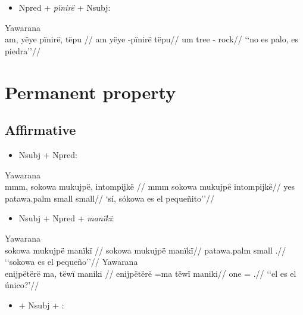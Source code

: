 \documentclass{memoir}
\begin{document}
\begin{itemize}
\tightlist
\item
  Npred + \emph{pïnirë} + Nsubj:
\end{itemize}

\ex Yawarana \\
\label{histyarirdi-623}    \begingl
    \glpreamble am, yëye pïnirë, tëpu //
    \gla am yëye -pïnirë tëpu//
    \glb um tree - rock//
        \glft ‘‘no es palo, es piedra’’//  
    \endgl 
\xe

\section{Permanent property}

\subsection{Affirmative}

\begin{itemize}
\tightlist
\item
  Nsubj + Npred:
\end{itemize}

\ex Yawarana \\
\label{convinsectmaj-118}    \begingl
    \glpreamble mmm, sokowa mukujpë, intompijkë //
    \gla mmm sokowa mukujpë intompijkë//
    \glb yes patawa.palm small small//
        \glft ‘sí, sókowa es el pequeñito’’//  
    \endgl 
\xe

\begin{itemize}
\tightlist
\item
  Nsubj + Npred + \emph{manïkï}:
\end{itemize}

\pex\label{}    \a Yawarana\\
    \label{convinsectmaj-108}        \begingl
        \glpreamble sokowa mukujpë manïkï //
        \gla sokowa mukujpë manïkï//
        \glb patawa.palm small .//
            \glft ‘‘sokowa es el pequeño’’//  
        \endgl 
    \a Yawarana\\
    \label{histpajirdi-271}        \begingl
        \glpreamble enijpëtërë ma, tëwï maniki //
        \gla enijpëtërë =ma tëwï maniki//
        \glb one =  .//
            \glft ‘‘el es el único?’//  
        \endgl 
\xe

\begin{itemize}
\tightlist
\item
   + Nsubj + :
\end{itemize}
\end{document}
